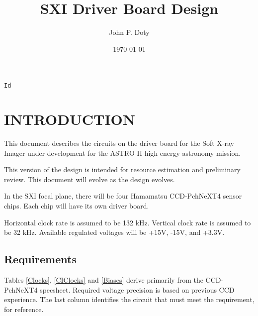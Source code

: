 \documentclass[a4paper,12pt]{article}
\author{John P. Doty}
\date{\today}
\title{SXI Driver Board Design}
\begin{document}
\begin{titlepage}
\maketitle
\centering
\verb$Id$
\end{titlepage} 

\section{INTRODUCTION}
This document describes the circuits on the driver board for the Soft X-ray Imager under development for the ASTRO-H high energy astronomy mission.

This version of the design is intended for resource estimation and preliminary review. This document will evolve as the design evolves.

In the SXI focal plane, there will be four Hamamatsu CCD-PchNeXT4 sensor chips. Each chip will have its own driver board. 

Horizontal clock rate is assumed to be 132 kHz. Vertical clock rate is assumed to be 32 kHz. Available regulated voltages will be +15V, -15V, and +3.3V. 


\subsection{Requirements}
Tables \ref{Clocks}, \ref{CIClocks} and \ref{Biases} derive primarily from the CCD-PchNeXT4 specsheet. Required voltage precision is based on previous CCD experience. The last column identifies the circuit that must meet the requirement, for reference.
\end{document}
